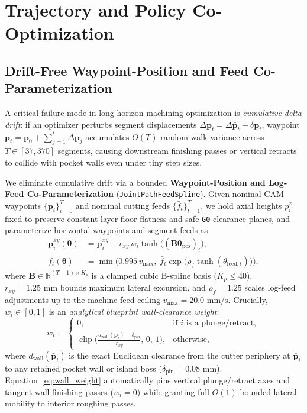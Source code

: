 \documentclass[conference]{IEEEtran}
\begin{document}
\section{Trajectory and Policy Co-Optimization}
\label{sec:methods}

\subsection{Drift-Free Waypoint-Position and Feed Co-Parameterization}
A critical failure mode in long-horizon machining optimization is \emph{cumulative delta drift}: if an optimizer perturbs segment displacements $\Delta\mathbf{p}_t = \Delta\bar{\mathbf{p}}_t + \delta\mathbf{p}_t$, waypoint $\mathbf{p}_t = \mathbf{p}_0 + \sum_{j=1}^t \Delta\mathbf{p}_j$ accumulates $O(T)$ random-walk variance across $T \in [37, 370]$ segments, causing downstream finishing passes or vertical retracts to collide with pocket walls even under tiny step sizes.

We eliminate cumulative drift via a bounded \textbf{Waypoint-Position and Log-Feed Co-Parameterization} (\texttt{JointPathFeedSpline}). Given nominal CAM waypoints $\{\bar{\mathbf{p}}_i\}_{i=0}^T$ and nominal cutting feeds $\{\bar{f}_t\}_{t=1}^T$, we hold axial heights $\bar{p}_i^z$ fixed to preserve constant-layer floor flatness and safe \texttt{G0} clearance planes, and parameterize horizontal waypoints and segment feeds as
\begin{equation}
  \begin{aligned}
    \mathbf{p}_i^{xy}(\boldsymbol{\theta}) &= \bar{\mathbf{p}}_i^{xy} + r_{xy}\,w_i\tanh\!\big((\mathbf{B}\boldsymbol{\theta}_{\text{pos}})_i\big), \\
    f_t(\boldsymbol{\theta}) &= \min\!\Big(0.995\,v_{\max},\; \bar{f}_t \exp\!\big(\rho_f \tanh(\theta_{\text{feed},t})\big)\Big),
  \end{aligned}
  \label{eq:joint_spline}
\end{equation}
where $\mathbf{B} \in \mathbb{R}^{(T+1)\times K_p}$ is a clamped cubic B-spline basis ($K_p \le 40$), $r_{xy} = 1.25\text{ mm}$ bounds maximum lateral excursion, and $\rho_f = 1.25$ scales log-feed adjustments up to the machine feed ceiling $v_{\max} = 20.0\text{ mm/s}$. Crucially, $w_i \in [0, 1]$ is an \emph{analytical blueprint wall-clearance weight}:
\begin{equation}
  w_i = \begin{cases}
    0, & \text{if } i \text{ is a plunge/retract}, \\
    \operatorname{clip}\!\big(\frac{d_{\text{wall}}(\bar{\mathbf{p}}_i) - \delta_{\text{pin}}}{r_{xy}},\, 0,\, 1\big), & \text{otherwise},
  \end{cases}
  \label{eq:wall_weight}
\end{equation}
where $d_{\text{wall}}(\bar{\mathbf{p}}_i)$ is the exact Euclidean clearance from the cutter periphery at $\bar{\mathbf{p}}_i$ to any retained pocket wall or island boss ($\delta_{\text{pin}} = 0.08\text{ mm}$). Equation~\eqref{eq:wall_weight} automatically pins vertical plunge/retract axes and tangent wall-finishing passes ($w_i = 0$) while granting full $O(1)$-bounded lateral mobility to interior roughing passes.
\end{document}
